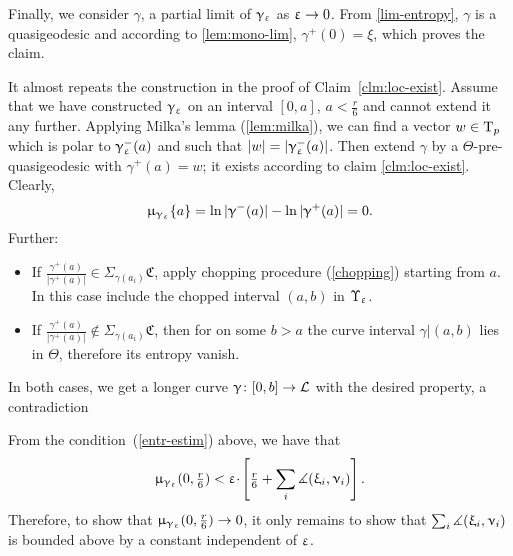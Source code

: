 Finally, we consider $\gamma$, a partial limit of $\upgamma_\upvarepsilon$ as $\eps\to0$.
From \ref{lim-entropy}, $\gamma$ is a quasigeodesic 
and according to \ref{lem:mono-lim}, $\gamma^+(0)=\xi$, which proves the claim.

 \label{transfinite-extension-2-page} 
It almost repeats the construction in the proof of Claim~\ref{clm:loc-exist}.
Assume that we have constructed
$\upgamma_\upvarepsilon$ on an interval $[0,a]$, $a<\tfrac{r}{6}$ and cannot extend it
any further. 
Applying Milka's lemma (\ref{lem:milka}), we can find a vector $w\in\T_p$ which is polar to $\upgamma^-_\upvarepsilon(a)$ and such that $|w|=|\upgamma^-_\upvarepsilon(a)|$.
Then extend $\gamma$ by a $\Theta$-pre-quasigeodesic
with $\gamma^+(a)=w$; it exists according to claim \ref{clm:loc-exist}.
Clearly, \[\upmu_{\upgamma_\upvarepsilon}\{a\}=\ln|\upgamma^-(a)|-\ln|\upgamma^+(a)|=0.\]
Further:
\begin{itemize}
\item If $\tfrac{\gamma^+(a)}{|\gamma^+(a)|}\in\Sigma_{\gamma(a_i)}\mathfrak C$, apply
chopping procedure (\ref{chopping}) starting
from $a$. In this case include the chopped interval $(a,b)$ in $\Upsilon_\upvarepsilon$.

\item If $\tfrac{\gamma^+(a)}{|\gamma^+(a)|}\notin\Sigma_{\gamma(a_i)}\mathfrak C$, then  for on some $b>a$ the curve interval  $\gamma|(a,b)$ lies in $\Theta$, therefore its entropy vanish.
\end{itemize}
In both cases, 
we get a longer curve $\gamma\:[0,b]\to \spc{L}$ with the desired property, a contradiction

From the condition~(\ref{entr-estim}) above, we have that 
\[
\mu_{\gamma_\eps}(0,\tfrac{r}{6})
<
\eps\cdot\l[\tfrac{r}{6}+\sum_i\mangle(\xi_i,\nu_i)\r].\]
Therefore, to show that $\mu_{\gamma_\eps}(0,\tfrac{r}{6})\to 0$, it only remains to show
that $\sum_i\measuredangle(\upxi_i,\upnu_i)$ is bounded above by a constant independent
of $\upvarepsilon$.


